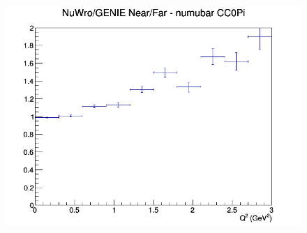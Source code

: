 \documentclass[12pt]{article}
\begin{document}
\begin{figure}[h]
\endminipage
{}
\includegraphics[width=\linewidth]{eff_Q2/GAr/ratios/CC0Pi_NuWro_GENIE_numubar_NF_Q2.png}
\endminipage
\newline
\end{figure}
\clearpage
\end{document}
